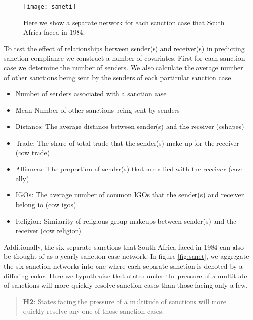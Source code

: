 \begin{figure}[ht]
	\centering
	\texttt{[image: saneti]}
	\caption{Here we show a separate network for each sanction case that South Africa faced in 1984.}
	\label{fig:saneti}
\end{figure}
\FloatBarrier

To test the effect of relationships between sender(s) and receiver(s) in predicting sanction compliance we construct a number of covariates. First for each sanction case we determine the number of senders. We also calculate the average number of other sanctions being sent by the senders of each particular sanction case.  

	\begin{itemize}
		\item Number of senders associated with a sanction case
		\item Mean Number of other sanctions being sent by senders
		\item Distance: The average distance between sender(s) and the receiver (cshapes)
		\item Trade: The share of total trade that the sender(s) make up for the receiver (cow trade)
		\item Alliances: The proportion of sender(s) that are allied with the receiver (cow ally)
		\item IGOs: The average number of common IGOs that the sender(s) and receiver belong to (cow igos)
		\item Religion: Similarity of religious group makeups between sender(s) and the receiver (cow religion)
	\end{itemize}

Additionally, the six separate sanctions that South Africa faced in 1984 can also be thought of as a yearly sanction case network. In figure \ref{fig:sanet}, we aggregate the six sanction networks into one where each separate sanction is denoted by a differing color. Here we hypothesize that states under the pressure of a multitude of sanctions will more quickly resolve sanction cases than those facing only a few.


\begin{quote}
	\textbf{H2}: States facing the pressure of a multitude of sanctions will more quickly resolve any one of those sanction cases.
\end{quote}

